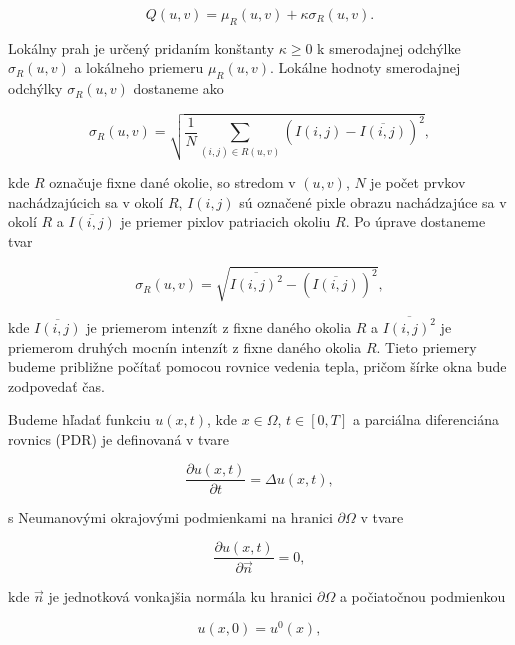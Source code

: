 \documentclass[a4paper,11pt,oneside]{article}%
\begin{document}
\begin{equation} \label{eq:nbO}
Q(u,v) = \mu_R(u,v) + \kappa\sigma_R(u,v).
\end{equation}

Lokálny prah je určený pridaním konštanty $\kappa \geq 0$ k smerodajnej odchýlke $\sigma_R(u,v)$ a lokálneho priemeru $\mu_R(u,v)$. Lokálne hodnoty smerodajnej odchýlky $\sigma_R(u,v)$ dostaneme ako 

\begin{equation} 
\sigma_R(u,v) = \sqrt{ \frac{1}{N} \sum_{(i,j) \in R(u,v)} (I(i,j) - \overline{I(i,j)})^2 },
\end{equation}

kde $R$ označuje fixne dané okolie, so stredom v $(u,v)$, $N$ je počet prvkov nachádzajúcich sa v okolí $R$, $I(i,j)$ sú označené pixle obrazu nachádzajúce sa v okolí $R$ a $\overline{I(i,j)}$ je priemer pixlov patriacich okoliu $R$. Po úprave dostaneme tvar

\begin{equation} 
\sigma_R(u,v) = \sqrt{ \overline{I(i,j)^2} - (\overline{I(i,j)})^2 },
\end{equation}

kde $\overline{I(i,j)}$ je priemerom intenzít z fixne daného okolia $R$ a $\overline{I(i,j)^2}$ je priemerom druhých mocnín intenzít z fixne daného okolia $R$. Tieto priemery budeme približne počítať pomocou rovnice vedenia tepla, pričom šírke okna bude zodpovedať čas. 

Budeme hľadať funkciu $u(x, t)$, kde $x \in \Omega$, $t \in [0, T]$ a parciálna diferenciána rovnics (PDR) je definovaná v tvare

\begin{equation}
\frac{\partial u(x, t)}{\partial t} = \Delta u(x,t),
\end{equation}

s Neumanovými okrajovými podmienkami na hranici $\partial \Omega$ v tvare

\begin{equation}
\frac{\partial u(x, t)}{\partial \vec{n}} = 0,
\end{equation}

kde $\vec{n}$ je jednotková vonkajšia normála ku hranici $\partial \Omega$ a počiatočnou podmienkou 

\begin{equation}
u(x, 0) = u^0(x),
\end{equation}
\end{document}
